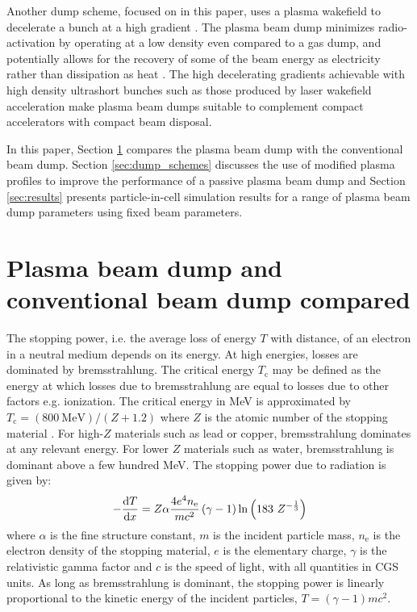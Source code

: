 \documentclass[aip,pop,preprint,superscriptaddress]{revtex4-1}
\begin{document}
Another dump scheme, focused on in this paper, uses a plasma wakefield to decelerate a bunch at a high gradient \cite{Wu}. The plasma beam dump minimizes radio-activation by operating at a low density even compared to a gas dump, and potentially allows for the recovery of some of the beam energy as electricity rather than dissipation as heat \cite{Wu}. The high decelerating gradients achievable with high density ultrashort bunches such as those produced by laser wakefield acceleration make plasma beam dumps suitable to complement compact accelerators with compact beam disposal.

In this paper, Section \ref{sec:comparison} compares the plasma beam dump with the conventional beam dump. Section \ref{sec:dump_schemes} discusses the use of modified plasma profiles to improve the performance of a passive plasma beam dump and Section \ref{sec:results} presents particle-in-cell simulation results for a range of plasma beam dump parameters using fixed beam parameters.

\section{Plasma beam dump and conventional beam dump compared}
\label{sec:comparison}
The stopping power, i.e. the average loss of energy $T$ with distance, of an electron in a neutral medium depends on its energy. At high energies, losses are dominated by bremsstrahlung. The critical energy $T_{\mathrm{c}}$ may be defined as the energy at which losses due to bremsstrahlung are equal to losses due to other factors e.g. ionization. The critical energy in MeV is approximated by $T_{\mathrm{c}} = (800{\mathrm{\ MeV}})/(Z+1.2)$ where $Z$ is the atomic number of the stopping material \cite{Proc_shower}. For high-$Z$ materials such as lead or copper, bremsstrahlung dominates at any relevant energy. For lower $Z$ materials such as water, bremsstrahlung is dominant above a few hundred MeV. The stopping power due to radiation is given by\cite{Wu}:
\begin{equation}
  \label{stopping_power}
  {-{{\mathrm{d}T}\over{\mathrm{d}x}}}={Z \alpha} {{4 e^4 n_{\mathrm e}}\over{m c^2}} \left(\gamma - 1\right) \ln \left(183\ Z^{-{1\over 3}}\right)
\end{equation}
where $\alpha$ is the fine structure constant, $m$ is the incident particle mass, $n_{\mathrm{e}}$ is the electron density of the stopping material, $e$ is the elementary charge, $\gamma$ is the relativistic gamma factor and $c$ is the speed of light, with all quantities in CGS units. As long as bremsstrahlung is dominant, the stopping power is linearly proportional to the kinetic energy of the incident particles, $T=\left(\gamma - 1\right) m c^2$.
\end{document}
